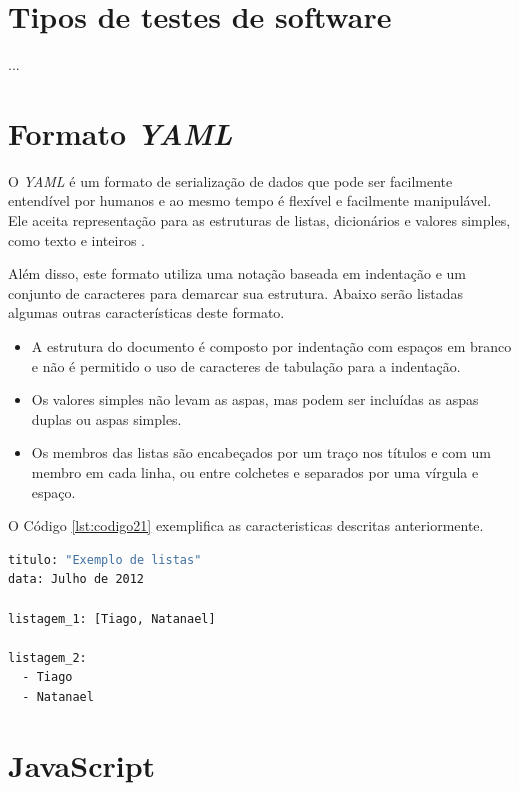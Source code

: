 \section{Tipos de testes de software}

...

\section{Formato \textit{YAML}}
\label{sec:yaml}

O \textit{YAML} é um formato de serialização de dados que pode ser facilmente entendível por humanos e ao mesmo tempo é flexível e facilmente manipulável. Ele aceita representação para as estruturas de listas, dicionários e valores simples, como texto e inteiros \cite{YAML}.

Além disso, este formato utiliza uma notação baseada em indentação e um conjunto de caracteres para demarcar sua estrutura. Abaixo serão listadas algumas outras características deste formato.

\begin{itemize}
\item A estrutura do documento é composto por indentação com espaços em branco e não é permitido o uso de caracteres de tabulação para a indentação.

\item Os valores simples não levam as aspas, mas podem ser incluídas as aspas duplas ou aspas simples.

\item Os membros das listas são encabeçados por um traço nos títulos e com um membro em cada linha, ou entre colchetes e separados por uma vírgula e espaço.
\end{itemize}

O Código \ref{lst:codigo21} exemplifica as caracteristicas descritas anteriormente.

{\singlespace
\begin{lstlisting}[caption=Estrutura do código \textit{YAML},language=bash,label={lst:codigo21}]
titulo: "Exemplo de listas"
data: Julho de 2012

listagem_1: [Tiago, Natanael]

listagem_2:
  - Tiago
  - Natanael
\end{lstlisting}
}


\section{JavaScript}

